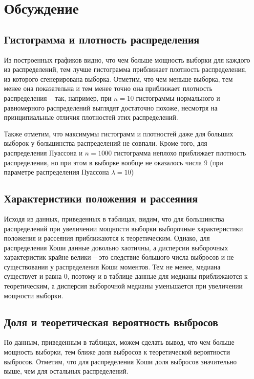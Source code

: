 \documentclass[12pt]{article}
\begin{document}
	\section{Обсуждение}
	
	\subsection{Гистограмма и плотность распределения}
	
	Из построенных графиков видно, что чем больше мощность выборки для каждого из распределений, тем лучше гистограмма приближает плотность распределения, из которого сгенерирована выборка. Отметим, что чем меньше выборка, тем менее она показательна и тем менее точно она приближает плотность распределения -- так, например, при $n=10$ гистограммы нормального и равномерного распределений выглядят достаточно похоже, несмотря на принципиальные отличия плотностей этих распределений.
	
	Также отметим, что максимумы гистограмм и плотностей даже для больших выборок у большинства распределений не совпали. Кроме того, для распределения Пуассона и $n=1000$ гистограмма неплохо приближает плотность распределения, но при этом в выборке вообще не оказалось числа 9 (при параметре распределения Пуассона $\lambda=10$)
	
	\subsection{Характеристики положения и рассеяния}
	
	Исходя из данных, приведенных в таблицах, видим, что для большинства распределений при увеличении мощности выборки выборочные характеристики положения и рассеяния приближаются к теоретическим. Однако, для распределения Коши данные довольно хаотичны, а дисперсии выборочных характеристик крайне велики -- это следствие большого числа выбросов и не существования у распределения Коши моментов. Тем не менее, медиана существует и равна 0, поэтому и в таблице данные для медианы приближаются к теоретическим, а дисперсия выборочной медианы уменьшается при увеличении мощности выборки.
	
	\subsection{Доля и теоретическая вероятность выбросов}
	
	По данным, приведенным в таблицах, можем сделать вывод, что чем больше мощность выборки, тем ближе доля выбросов к теоретической вероятности выбросов. Отметим, что для распределения Коши доля выбросов значительно выше, чем для остальных распределений.
	
\end{document}
